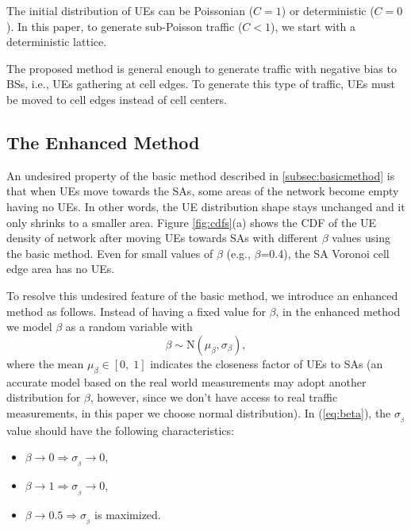 \documentclass[journal]{IEEEtran}
\begin{document}
The initial distribution of UEs can be Poissonian ($C=1$) or deterministic ($C=0$). In this paper, to generate sub-Poisson traffic ($C<1$), we start with a deterministic lattice.

The proposed method is general enough to generate traffic with negative bias to BSs, i.e., UEs gathering at cell edges. To generate this type of traffic, UEs must be moved to cell edges instead of cell centers.

















\subsection{The Enhanced Method}
\label{subsec:improvedmethod}

An undesired property of the basic method described in \ref{subsec:basicmethod} is that when UEs move towards the SAs, some areas of the network become empty having no UEs. In other words, the UE distribution shape stays unchanged and it only shrinks to a smaller area. Figure \ref{fig:cdfs}(a) shows the CDF of the UE density of network after moving UEs towards SAs with different $\beta$ values using the basic method. Even for small values of $\beta$ (e.g., $\beta$=0.4), the SA Voronoi cell edge area has no UEs.

To resolve this undesired feature of the basic method, we introduce an enhanced method as follows. Instead of having a fixed value for $\beta$, in the enhanced method we model $\beta$ as a random variable with
\begin{equation}
\label{eq:beta}
\beta \sim \text{N}(\mu_{\beta},\sigma_{\beta}),
\end{equation}
where the mean $\mu_{\beta} \in \left [0, \; 1 \right]$ indicates the closeness factor of UEs to SAs (an accurate model based on the real world measurements may adopt another distribution for $\beta$, however, since we don’t have access to real traffic measurements, in this paper we choose normal distribution). In (\ref{eq:beta}), the $\sigma_{_{\beta}}$ value should have the following characteristics:
\begin{itemize}
\item $\beta \rightarrow 0 \Rightarrow \sigma_{_{\beta}} \rightarrow 0$,
\item $\beta \rightarrow 1 \Rightarrow \sigma_{_{\beta}} \rightarrow 0$,
\item $\beta \rightarrow 0.5 \Rightarrow \sigma_{_{\beta}}$ is maximized.
\end{itemize}
\end{document}
